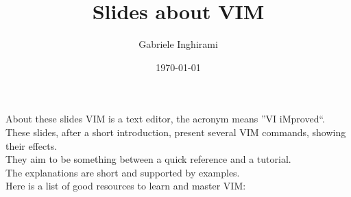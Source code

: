 

    
    \author[Gabriele Inghirami]{Gabriele Inghirami}
    \title[Slides about VIM]{Slides about VIM}
    \date{\today}
    \maketitle
    
    \begin{frame}{About these slides}
    VIM is a text editor, the acronym means ''VI iMproved``.\\
    These slides, after a short introduction, present several VIM commands, showing their effects.\\
    They aim to be something between a quick reference and a tutorial.\\
    The explanations are short and supported by examples.\\
    Here is a list of good resources to learn and master VIM:
    \end{frame}
     

